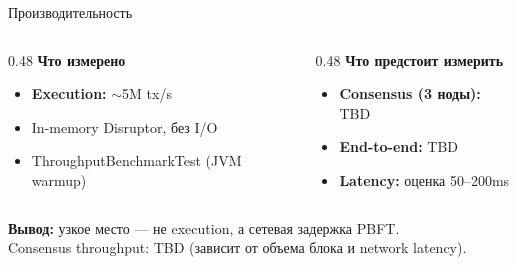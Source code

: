 \documentclass[aspectratio=169]{beamer}
\begin{document}
\begin{frame}{Производительность}

\begin{columns}[t]
\begin{column}{0.48\textwidth}
\textbf{Что измерено}
\vspace{0.3em}
\begin{itemize}
    \item[\textcolor{green}{\checkmark}] \textbf{Execution:} $\sim$5M tx/s
    \item In-memory Disruptor, без I/O
    \item ThroughputBenchmarkTest (JVM warmup)
\end{itemize}
\end{column}
\begin{column}{0.48\textwidth}
\textbf{Что предстоит измерить}
\vspace{0.3em}
\begin{itemize}
    \item[\textcolor{orange}{?}] \textbf{Consensus (3 ноды):} TBD
    \item[\textcolor{orange}{?}] \textbf{End-to-end:} TBD
    \item[\textcolor{orange}{?}] \textbf{Latency:} оценка 50--200ms
\end{itemize}
\end{column}
\end{columns}

\vspace{0.8em}
\textbf{Вывод:} узкое место --- не execution, а сетевая задержка PBFT.\\
Consensus throughput: TBD (зависит от объема блока и network latency).
\end{frame}
\end{document}
